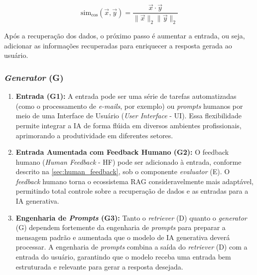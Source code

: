 \documentclass[a4paper, 12pt]{article}
\begin{document}
    \begin{equation} 
        \text{sim}_{\cos}(\vec{x}, \vec{y}) = \frac{\vec{x} \cdot \vec{y}}{\|\vec{x}\|_2 \|\vec{y}\|_2}
        \label{eq:cosseno}
    \end{equation}

    Após a recuperação dos dados, o próximo passo é aumentar a entrada, ou seja, adicionar as informações recuperadas para enriquecer a resposta gerada ao usuário.

    \subsubsection{\textit{Generator} (G)}


    \begin{enumerate}
        \item \textbf{Entrada (G1):} A entrada pode ser uma série de tarefas automatizadas (como o processamento de \textit{e-mails}, por exemplo) ou \textit{prompts} humanos por meio de uma Interface de Usuário (\textit{User Interface} - UI). Essa flexibilidade permite integrar a IA de forma flúida em diversos ambientes profissionais, aprimorando a produtividade em diferentes setores.
        \item \textbf{Entrada Aumentada com Feedback Humano (G2):} O feedback humano (\textit{Human Feedback} - HF) pode ser adicionado à entrada, conforme descrito na \autoref{sec:human_feedback}, sob o componente \textit{evaluator} (E). O \textit{feedback} humano torna o ecossistema RAG consideravelmente mais adaptável, permitindo total controle sobre a recuperação de dados e as entradas para a IA generativa.
        \item \textbf{Engenharia de \textit{Prompts} (G3):} Tanto o \textit{retriever} (D) quanto o \textit{generator} (G) dependem fortemente da engenharia de \textit{prompts} para preparar a mensagem padrão e aumentada que o modelo de IA generativa deverá processar. A engenharia de \textit{prompts} combina a saída do \textit{retriever} (D) com a entrada do usuário, garantindo que o modelo receba uma entrada bem estruturada e relevante para gerar a resposta desejada.
    \end{enumerate}
\end{document}
